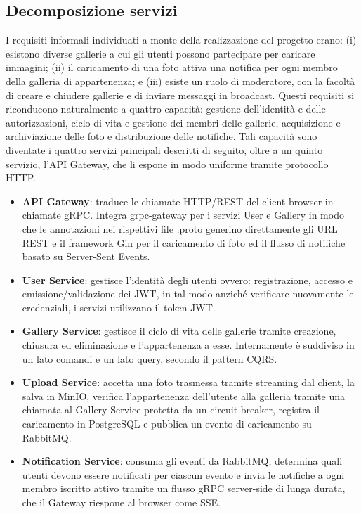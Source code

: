 \documentclass[conference]{IEEEtran}
\begin{document}
\subsection{Decomposizione servizi}
I requisiti informali individuati a monte della realizzazione del progetto erano: (i) esistono diverse gallerie a cui gli utenti possono partecipare per caricare immagini; (ii) il caricamento di una foto attiva una notifica per ogni membro della galleria di appartenenza; e (iii) esiste un ruolo di moderatore, con la facoltà di creare e chiudere gallerie e di inviare messaggi in broadcast. Questi requisiti si riconducono naturalmente a quattro capacità: gestione dell'identità e delle autorizzazioni, ciclo di vita e gestione dei membri delle gallerie, acquisizione e archiviazione delle foto e distribuzione delle notifiche. Tali capacità sono diventate i quattro servizi principali descritti di seguito, oltre a un quinto servizio, l'API Gateway, che li espone in modo uniforme tramite protocollo HTTP.
\begin{itemize}
\item \textbf{API Gateway}: traduce le chiamate HTTP/REST del client browser in chiamate gRPC. Integra grpc-gateway per i servizi User e Gallery in modo che le annotazioni nei rispettivi file .proto generino direttamente gli URL REST e il framework Gin per il caricamento di foto ed il flusso di notifiche basato su Server-Sent Events.
\item \textbf{User Service}: gestisce l'identità degli utenti ovvero: registrazione, accesso e emissione/validazione dei JWT, in tal modo anziché verificare nuovamente le credenziali, i servizi utilizzano il token JWT.
\item \textbf{Gallery Service}: gestisce il ciclo di vita delle gallerie tramite creazione, chiusura ed eliminazione e l'appartenenza a esse. Internamente è suddiviso in un lato comandi e un lato query, secondo il pattern CQRS.
\item \textbf{Upload Service}: accetta una foto trasmessa tramite streaming dal client, la salva in MinIO, verifica l’appartenenza dell’utente alla galleria tramite una chiamata al Gallery Service protetta da un circuit breaker, registra il caricamento in PostgreSQL e pubblica un evento di caricamento su RabbitMQ.
\item \textbf{Notification Service}: consuma gli eventi da RabbitMQ, determina quali utenti devono essere notificati per ciascun evento e invia le notifiche a ogni membro iscritto attivo tramite un flusso gRPC server-side di lunga durata, che il Gateway riespone al browser come SSE.
\end{itemize}
\end{document}

